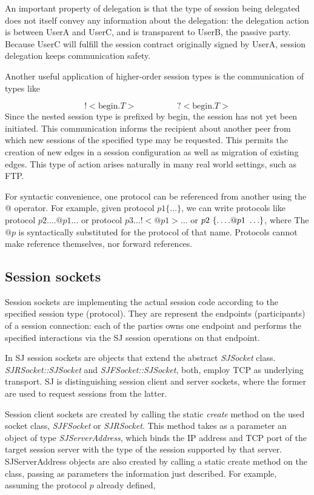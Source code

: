 An important property of delegation is that the type of session being delegated does not itself convey any information about the delegation: the delegation action is between UserA and UserC, and is transparent to UserB, the passive party. Because UserC will fulfill the session contract originally signed by UserA, session delegation keeps communication safety.

Another useful application of higher-order session types is the communication of types like

\begin{equation*}
!<\text{begin}.T> \hspace{2cm} ?<\text{begin}.T>
\end{equation*}
Since the nested session type is prefixed by begin, the session has not yet been initiated. This communication informs the recipient about another peer from which new sessions of the specified type may be requested. This permits the creation of new edges in a session configuration as well as migration of existing edges. This type of action arises naturally in many real world settings, such as FTP.

For syntactic convenience, one protocol can be referenced from another using the @ operator. For example, given protocol $p1\{\dots\}$, we can write protocols like protocol  $p2{\dots .@p1 \dots}$ or protocol $p3{\dots !<@p1> \dots}$ or $p{\rm 2\ }{\rm \{}{\rm \dots .@}p{\rm 1\ \dots }{\rm \}}$, where The $@p$ is syntactically substituted for the protocol of that name. Protocols cannot make reference themselves, nor forward references.

\subsection{Session sockets}

Session sockets are implementing the actual session code according to the specified session type (protocol). They are represent the endpoints (participants) of a session connection: each of the parties owns one endpoint and performs the specified interactions via the SJ session operations on that endpoint.

In SJ session sockets are objects that extend the abstract \textit{SJSocket} class. \textit{SJRSocket::SJSocket} and \textit{SJFSocket::SJSocket}, both, employ TCP as underlying transport. SJ is distinguishing session client and server sockets, where the former are used to request sessions from the latter.

Session client sockets are created by calling the static \textit{create} method on the used socket class, \textit{SJFSocket} or \textit{SJRSocket}. This method takes as a parameter an object of type \textit{SJServerAddress}, which binds the IP address and TCP port of the target session server with the type of the session supported by that server. SJServerAddress objects are also created by calling a static create method on the class, passing as parameters the information just described. For example, assuming the protocol $p$ already defined,

